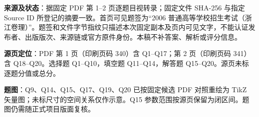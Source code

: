 

\begin{gktip}
\textbf{来源及状态}：据固定 PDF 第 1–2 页逐题目视转录；固定文件 SHA-256 与指定 Source ID 所登记的摘要一致。首页可见题签为“2006 普通高等学校招生考试（浙江卷理）”。题签和文件字节指纹只描述本次固定副本及页内可见文字，不能认证发布者、出版版次、来源链或官方原件身份。本稿不补答案、解析或评分信息。

\textbf{源页定位}：PDF 第 1 页（印刷页码 340）含 Q1–Q17；第 2 页（印刷页码 341）含 Q18–Q20。选择题 Q1–Q10，填空题 Q11–Q14，解答题 Q15–Q20。源页未标逐题分值或总分。

\textbf{题图}：Q9、Q14、Q15、Q17、Q19、Q20 已按固定候选 PDF 对照重绘为 TikZ 矢量图；未标尺寸的空间关系仅作示意。Q15 参数范围按源页保留为闭区间。题图仍需随正式项目版面复核。
\end{gktip}


